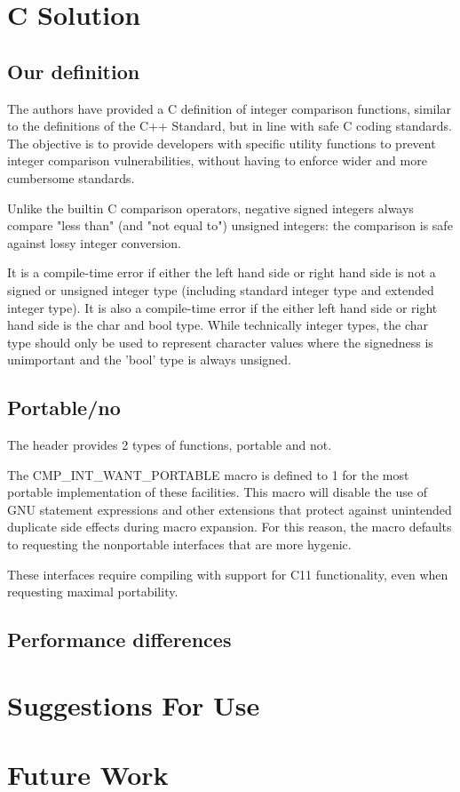 \documentclass[11pt,letterpaper]{article}
\begin{document}
\blindtext
{}

\section{C Solution}
\label{sec:cimplementation}
\subsection{Our definition}
The authors have provided a C definition of integer comparison functions, similar to the definitions of the C++ Standard, but in line with safe C coding standards. The objective is to provide developers with specific utility functions to prevent integer comparison vulnerabilities, without having to enforce wider and more cumbersome standards. 

Unlike the builtin C comparison operators, negative signed integers always compare "less than" (and "not equal to") unsigned integers: the comparison is safe against lossy integer conversion.

It is a compile-time error if either the left hand side or right hand side is not a signed or unsigned integer type (including standard integer type and extended integer type). It is also a compile-time error if the either left hand side or right hand side is the char and bool type. While technically integer types, the char type should only be used to represent character values where the signedness is unimportant and the 'bool' type is always unsigned.

\subsection{Portable/no}
The header provides 2 types of functions, portable and not. 

The CMP_INT_WANT_PORTABLE macro is defined to 1 for the most portable implementation of these facilities. This macro will disable the use of GNU statement expressions and other extensions that protect against unintended duplicate side effects during macro expansion. For this reason, the macro defaults to requesting the nonportable interfaces that are more hygenic.

These interfaces require compiling with support for C11 functionality, even when requesting maximal portability.

\subsection{Performance differences}

\section{Suggestions For Use}
\label{sec:suggestions}

\section{Future Work}
\label{sec:futurework}
\printindex
\end{document}
